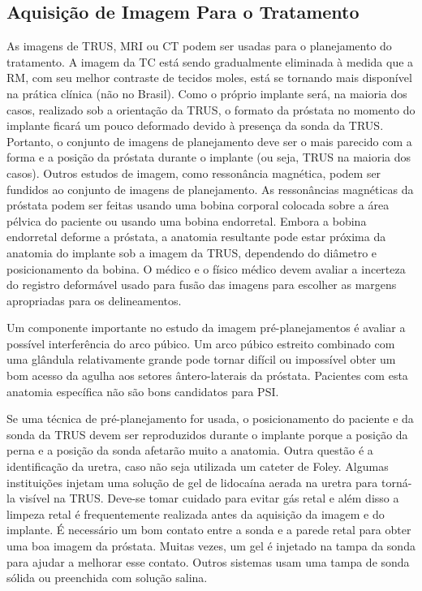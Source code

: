 \documentclass[11pt,a4paper]{article}
\begin{document}
\subsection*{Aquisição de Imagem Para o Tratamento}

	As imagens de TRUS, MRI ou CT podem ser usadas para o planejamento do tratamento. A imagem da TC está sendo gradualmente eliminada à medida que a RM, com seu melhor contraste de tecidos moles, está se tornando mais disponível na prática clínica (não no Brasil). Como o próprio implante será, na maioria dos casos, realizado sob a orientação da TRUS, o formato da próstata no momento do implante ficará um pouco deformado devido à presença da sonda da TRUS. Portanto, o conjunto de imagens de planejamento deve ser o mais parecido com a forma e a posição da próstata durante o implante (ou seja, TRUS na maioria dos casos). Outros estudos de imagem, como ressonância magnética, podem ser fundidos ao conjunto de imagens de planejamento. As ressonâncias magnéticas da próstata podem ser feitas usando uma bobina corporal colocada sobre a área pélvica do paciente ou usando uma bobina endorretal. Embora a bobina endorretal deforme a próstata, a anatomia resultante pode estar próxima da anatomia do implante sob a imagem da TRUS, dependendo do diâmetro e posicionamento da bobina. O médico e o físico médico devem avaliar a incerteza do registro deformável usado para fusão das imagens para escolher as margens apropriadas para os delineamentos.

	Um componente importante no estudo da imagem pré-planejamentos é avaliar a possível interferência do arco púbico. Um arco púbico estreito combinado com uma glândula relativamente grande pode tornar difícil ou impossível obter um bom acesso da agulha aos setores ântero-laterais da próstata. Pacientes com esta anatomia específica não são bons candidatos para PSI.

	Se uma técnica de pré-planejamento for usada, o posicionamento do paciente e da sonda da TRUS devem ser reproduzidos durante o implante porque a posição da perna e a posição da sonda afetarão muito a anatomia. Outra questão é a identificação da uretra, caso não seja utilizada um cateter de Foley. Algumas instituições injetam uma solução de gel de lidocaína aerada na uretra para torná-la visível na TRUS. Deve-se tomar cuidado para evitar gás retal e além disso a limpeza retal é frequentemente realizada antes da aquisição da imagem e do implante. É necessário um bom contato entre a sonda e a parede retal para obter uma boa imagem da próstata. Muitas vezes, um gel é injetado na tampa da sonda para ajudar a melhorar esse contato. Outros sistemas usam uma tampa de sonda sólida ou preenchida com solução salina.
	
\end{document}
